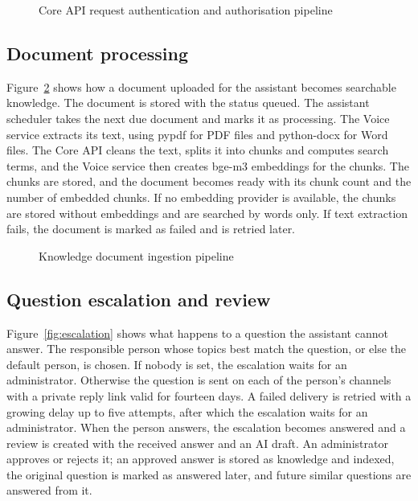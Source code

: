 {
  \begin{figure}[!htbp]
    \centering
    \caption{Core API request authentication and authorisation pipeline}
    \label{fig:pipeline}
  \end{figure}
}

\subsection{Document processing}
Figure~\ref{fig:ingestion} shows how a document uploaded for the assistant becomes searchable knowledge. The document is stored with the status queued. The assistant scheduler takes the next due document and marks it as processing. The Voice service extracts its text, using pypdf for PDF files and python-docx for Word files. The Core API cleans the text, splits it into chunks and computes search terms, and the Voice service then creates bge-m3 embeddings for the chunks. The chunks are stored, and the document becomes ready with its chunk count and the number of embedded chunks. If no embedding provider is available, the chunks are stored without embeddings and are searched by words only. If text extraction fails, the document is marked as failed and is retried later.

{
  \begin{figure}[!htbp]
    \centering
    \caption{Knowledge document ingestion pipeline}
    \label{fig:ingestion}
  \end{figure}
}

\subsection{Question escalation and review}
Figure~\ref{fig:escalation} shows what happens to a question the assistant cannot answer. The responsible person whose topics best match the question, or else the default person, is chosen. If nobody is set, the escalation waits for an administrator. Otherwise the question is sent on each of the person's channels with a private reply link valid for fourteen days. A failed delivery is retried with a growing delay up to five attempts, after which the escalation waits for an administrator. When the person answers, the escalation becomes answered and a review is created with the received answer and an AI draft. An administrator approves or rejects it; an approved answer is stored as knowledge and indexed, the original question is marked as answered later, and future similar questions are answered from it.

